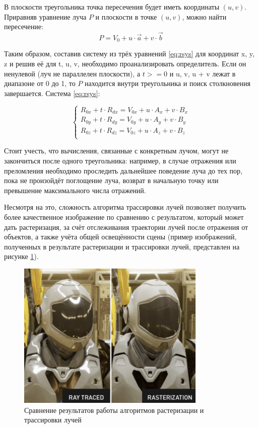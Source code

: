 В плоскости треугольника точка пересечения будет иметь координаты $(u, v)$. Приравняв уравнение луча $P$ и плоскости в точке $(u, v)$, можно найти пересечение:
\begin{equation}
	P= V_0 + u \cdot \vec{a} + v \cdot \vec{b}
	\label{eq:p2}
\end{equation}

Таким образом, составив систему из трёх уравнений \ref{eq:rsys} для координат x, y, z и решив её для t, u, v, необходимо проанализировать определитель. Если 
он ненулевой (луч не параллелен плоскости), а $ t >= 0$ и u, v, u + v лежат в диапазоне от 0 до 1, то $P$ находится внутри треугольника и поиск столкновения завершается. Система \ref{eq:rsys}:

\begin{equation}
	\begin{cases}
		R_{0x} + t \cdot R_{dx} = V_{0x} + u \cdot A_x + v \cdot B_x \\
		R_{0y} + t \cdot R_{dy} = V_{0y} + u \cdot A_y + v \cdot B_y \\
		R_{0z} + t \cdot R_{dz} = V_{0z} + u \cdot A_z + v \cdot B_z \\
	\end{cases}
	\label{eq:rsys}
\end{equation}

Стоит учесть, что вычисления, связанные с конкретным лучом, могут не 
закончиться после одного треугольника: например, в случае отражения или 
преломления необходимо проследить дальнейшее поведение луча до тех пор, 
пока не произойдёт поглощение луча, возврат в начальную точку или превышение максимального числа отражений.

Несмотря на это, сложность алгоритма трассировки лучей позволяет получить более качественное изображение по сравнению с результатом, который может дать растеризация, за счёт отслеживания траектории лучей после отражения от объектов, а также учёта общей освещённости сцены (пример изображений, полученных в результате растеризации и трассировки лучей, представлен на рисунке \ref{fig:rasterisationVsRayTracing}).

\begin{figure}[h]
	\centering
	\captionsetup{justification=centering}
	\includegraphics[width=90mm]{img/rasterisationVsRayTracing.png}
	\caption{Сравнение результатов работы алгоритмов растеризации и 
		трассировки лучей}
	\label{fig:rasterisationVsRayTracing}
\end{figure}

